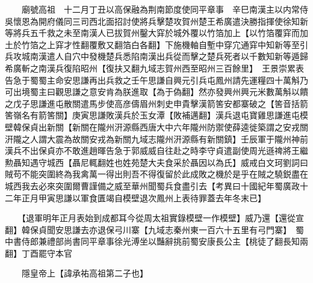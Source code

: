　　廟號高祖　十二月丁丑以高保融為荆南節度使同平章事　辛巳南漢主以内常侍吳懷恩為開府儀同三司西北面招討使將兵擊楚攻賀州楚王希廣遣決勝指揮使徐知新等將兵五千救之未至南漢人已拔賀州鑿大穽於城外覆以竹箔加上【以竹箔覆穽而加土於竹箔之上穽才性翻覆敷又翻箔白各翻】下施機軸自塹中穿宂通穽中知新等至引兵攻城南漢遣人自穴中發機楚兵悉陷南漢出兵從而擊之楚兵死者以千數知新等遁歸希廣斬之南漢兵復陷昭州【復扶又翻九域志賀州西至昭州三百餘里】　王景崇累表告急于蜀蜀主命安思謙再出兵救之壬午思謙自興元引兵屯鳳州請先運糧四十萬斛乃可出境蜀主曰觀思謙之意安肯為朕進取【為于偽翻】然亦發興州興元米數萬斛以饋之戊子思謙進屯散關遣馬步使高彦儔眉州刺史申貴擊漢箭筈安都寨破之【筈音括箭筈嶺名有箭筈關】庚寅思謙敗漢兵於玉女潭【敗補邁翻】漢兵退屯寶雞思謙進屯模壁韓保貞出新關【新關在隴州汧源縣西唐大中六年隴州防禦使薛逵徙築謂之安戎關汧隴之人謂大震為故關安戎為新關九域志隴州汧源縣有新關鎮】壬辰軍于隴州神前漢兵不出保貞亦不敢進趙暉告急于郭威威自往赴之時李守貞遣副使周光遜禆將王繼勲聶知遇守城西【聶尼輒翻姓也姓苑楚大夫食采於聶因以為氏】威戒白文珂劉詞曰賊苟不能突圍終為我禽萬一得出則吾不得復留於此成敗之機於是乎在賊之驍鋭盡在城西我去必來突圍爾曹謹備之威至華州聞蜀兵食盡引去【考異曰十國紀年蜀廣政十二年正月甲寅思謙以軍食匱竭自模壁退次鳳州上表待罪蓋去年冬末已】

　　【退軍明年正月表始到成都耳今從周太祖實錄模壁一作模壁】威乃還【還從宣翻】韓保貞聞安思謙去亦退保弓川寨【九域志秦州東一百六十五里有弓門寨】　蜀中書侍郎兼禮部尚書同平章事徐光溥坐以豔辭挑前蜀安康長公主【桃徒了翻長知兩翻】丁酉罷守本官

　　隱皇帝上【諱承祐高祖第二子也】

